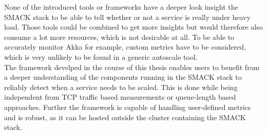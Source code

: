 None of the introduced tools or frameworks have a deeper look insight the SMACK stack to be able to tell whether or not a service is really under heavy load.
Those tools could be combined to get more insights but would therefore also consume a lot more resources, which is not desirable at all.
To be able to accurately monitor Akka for example, custom metrics have to be considered, which is very unlikely to be found in a generic autoscale tool.\\
The framework develped in the course of this thesis enables users to benefit from a deeper understanding of the components running in the SMACK stack to reliably detect when a service needs to be scaled.
This is done while being independent from TCP traffic based measurements or queue-length based approaches.
Further the framework is capable of handling user-defined metrics and is robust, as it can be hosted outside the cluster containing the SMACK stack.
